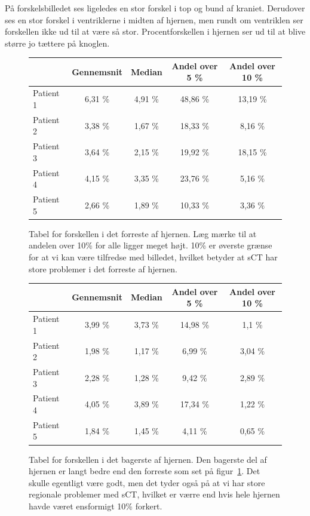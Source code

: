 På forskelsbilledet ses ligeledes en stor forskel i top og bund af
kraniet. Derudover ses en stor forskel i ventriklerne i midten af
hjernen, men rundt om ventriklen ser forskellen ikke ud til at være så
stor. Procentforskellen i hjernen ser ud til at blive større jo tættere
på knoglen.


\begin{figure}
    \centering
    \begin{tabular}{| l | c | c | c | c |}
        \hline
         & Gennemsnit & Median & Andel over 5 \% & Andel over 10 \% \\ \hline
        Patient 1 & 6,31 \% & 4,91 \% & 48,86 \% & 13,19 \% \\ \hline
        Patient 2 & 3,38 \% & 1,67 \% & 18,33 \% & 8,16 \% \\ \hline
        Patient 3 & 3,64 \% & 2,15 \% & 19,92 \% & 18,15 \% \\ \hline
        Patient 4 & 4,15 \% & 3,35 \% & 23,76 \% & 5,16 \% \\ \hline
        Patient 5 & 2,66 \% & 1,89 \% & 10,33 \% & 3,36 \% \\ \hline
    \end{tabular}
    \caption{Tabel for forskellen i det forreste af hjernen. Læg mærke til at andelen over 10\% for alle ligger meget højt. 10\% er øverste grænse for at vi kan være tilfredse med billedet, hvilket betyder at sCT har store problemer i det forreste af hjernen.}
    \label{tab:loocv_forresthjerne}
\end{figure}

\begin{figure}
    \centering
    \begin{tabular}{| l | c | c | c | c |}
        \hline
         & Gennemsnit & Median & Andel over 5 \% & Andel over 10 \% \\ \hline
        Patient 1 & 3,99 \% & 3,73 \% & 14,98 \% & 1,1 \% \\ \hline
        Patient 2 & 1,98 \% & 1,17 \% & 6,99 \% & 3,04 \% \\ \hline
        Patient 3 & 2,28 \% & 1,28 \% & 9,42 \% & 2,89 \% \\ \hline
        Patient 4 & 4,05 \% & 3,89 \% & 17,34 \% & 1,22 \% \\ \hline
        Patient 5 & 1,84 \% & 1,45 \% & 4,11 \% & 0,65 \% \\ \hline
    \end{tabular}
    \caption{Tabel for forskellen i det bagerste af hjernen. Den bagerste del af hjernen er langt bedre end den forreste som set på figur~\ref{tab:loocv_forresthjerne}. Det skulle egentligt være godt, men det tyder også på at vi har store regionale problemer med sCT, hvilket er værre end hvis hele hjernen havde været ensformigt 10\% forkert.}
    \label{tab:loocv_bagersthjerne}
\end{figure}

